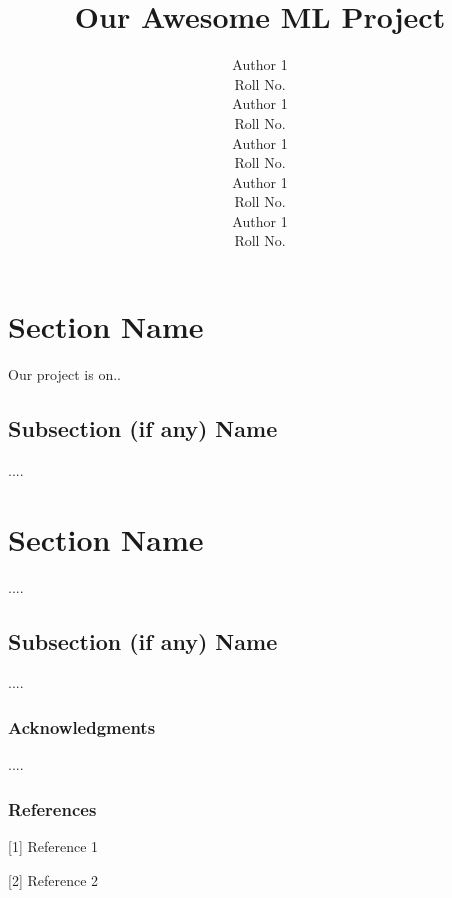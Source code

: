 \documentclass{article} %
\title{Our Awesome ML Project}
\author{
Author 1 \\
Roll No. \\
\And
Author 1 \\
Roll No. \\
\AND
Author 1 \\
Roll No. \\
\And
Author 1 \\
Roll No. \\
\And
Author 1 \\
Roll No. \\
}
\begin{document}



\section{Section Name}

Our project is on..

\subsection{Subsection (if any) Name}

....

\section{Section Name}

....

\subsection{Subsection (if any) Name}

....


\subsubsection*{Acknowledgments}

....

\subsubsection*{References}

\small{
[1] Reference 1

[2] Reference 2
}
\end{document}
